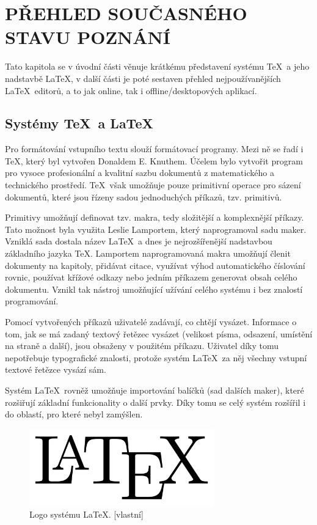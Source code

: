 
\chapter{PŘEHLED SOUČASNÉHO STAVU POZNÁNÍ}
Tato kapitola se v úvodní části věnuje krátkému představení systému \TeX\ a jeho nadstavbě \LaTeX, v další části je poté sestaven přehled nejpoužívanějších \LaTeX\ editorů, a to jak online, tak i offline/desktopových aplikací.

\section{Systémy \TeX\ a \LaTeX}
Pro formátování vstupního textu slouží formátovací programy. Mezi ně se řadí i \TeX, který byl vytvořen Donaldem E. Knuthem. Účelem bylo vytvořit program pro vysoce profesionální a kvalitní sazbu dokumentů z matematického a technického prostředí. \TeX\ však umožňuje pouze primitivní operace pro sázení dokumentů, které jsou řízeny sadou jednoduchých příkazů, tzv. primitivů. \cite{Kopka}

Primitivy umožňují definovat tzv. makra, tedy složitější a komplexnější příkazy. Tato možnost byla využita Leslie Lamportem, který naprogramoval sadu maker. Vzniklá sada dostala název \LaTeX\ a dnes je nejrozšířenější nadstavbou základního jazyka \TeX. Lamportem naprogramovaná makra umožňují členit dokumenty na kapitoly, přidávat citace, využívat výhod automatického číslování rovnic, používat křížové odkazy nebo jedním příkazem generovat obsah celého dokumentu. Vznikl tak nástroj umožňující užívání celého systému i bez znalostí programování. \cite{Kopka}

Pomocí vytvořených příkazů uživatelé zadávají, co chtějí vysázet. Informace o tom, jak se má zadaný textový řetězec vysázet (velikost písma, odsazení, umístění na straně a další), jsou obsaženy v použitém příkazu. Uživatel díky tomu nepotřebuje typografické znalosti, protože systém \LaTeX\ za něj všechny vstupní textové řetězce vysází sám. \cite{Rybicka}

Systém \LaTeX\ rovněž umožňuje importování balíčků (sad dalších maker), které rozšiřují základní funkcionality o další prvky. Díky tomu se celý systém rozšířil i do oblastí, pro které nebyl zamýšlen. \cite{Kopka}

\begin{figure}[h]
	\centering
	\includegraphics[width=8cm]{obrazky/latex.png}
	\caption[Logo systému \LaTeX.]{Logo systému \LaTeX. [vlastní]}
	\label{fig:latexlogo}
\end{figure}

